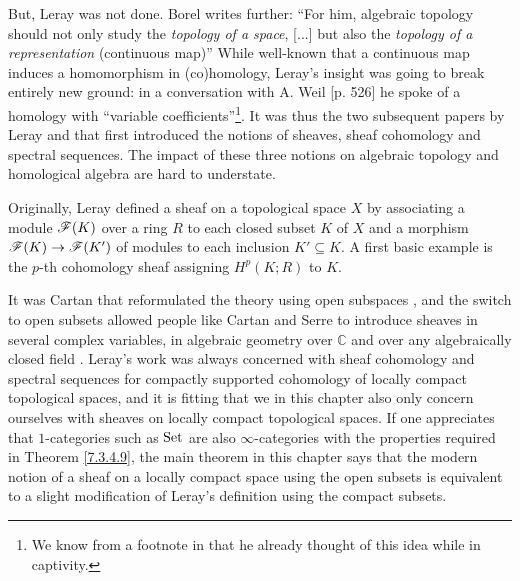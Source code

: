 \documentclass[../../thesis.tex]{subfiles}
\begin{document}
But, Leray was not done.
Borel writes further: ``For him, algebraic topology should not only study the \emph{topology of a space}, [...] but also the \emph{topology of a representation} (continuous map)''
While well-known that a continuous map induces a homomorphism in (co)homology, Leray's insight was going to break entirely new ground: in a conversation with A. Weil \cite{WeilCollectedPapers}[p. 526] he spoke of a homology with ``variable coefficients''\footnote{We know from a footnote in \cite{Leray45} that he already thought of this idea while in captivity.}.
It was thus the two subsequent papers by Leray \cite{Leray46a} and \cite{Leray46b} that first introduced the notions of sheaves, sheaf cohomology and spectral sequences.
The impact of these three notions on algebraic topology and homological algebra are hard to understate.

Originally, Leray defined a sheaf on a topological space $X$ by associating a module $\mathscr{F}(K)$ over a ring $R$ to each closed subset $K$ of $X$ and a morphism $\mathscr{F}(K) \to \mathscr{F}(K')$ of modules to each inclusion $K' \subseteq K$.
A first basic example is the $p$-th cohomology sheaf assigning $H^p(K ; R)$ to $K$.

It was Cartan that reformulated the theory using open subspaces \cite{H.Miller}, and the switch to open subsets allowed people like Cartan and Serre to introduce sheaves in several complex variables, in algebraic geometry over $\mathbb{C}$ and over any algebraically closed field \cite{BorelAMS}.
Leray's work was always concerned with sheaf cohomology and spectral sequences for compactly supported cohomology of locally compact topological spaces, and it is fitting that we in this chapter also only concern ourselves with sheaves on locally compact topological spaces.
If one appreciates that $1$-categories such as $\mathrm{Set}$ are also $\infty$-categories with the properties required in Theorem \ref{7.3.4.9}, the main theorem in this chapter says that the modern notion of a sheaf on a locally compact space using the open subsets is equivalent to a slight modification of Leray's definition using the compact subsets.

\end{document}
